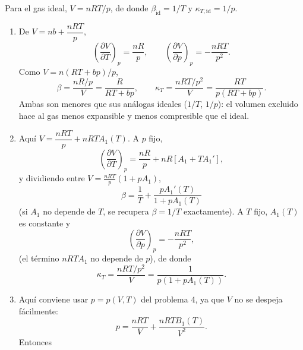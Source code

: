 \documentclass[12pt,a4paper]{article}
\newcommand{\pd}[3]{\left(\frac{\partial #1}{\partial #2}\right)_{#3}}
\begin{document}
    \begin{solucion}
        Para el gas ideal, $V=nRT/p$, de donde $\beta_{\text{id}}=1/T$ y $\kappa_{T,\text{id}}=1/p$.
        \begin{enumerate}
            \item[1)] De $V=nb+\dfrac{nRT}{p}$,
            \begin{equation*}
                \pd VTp=\frac{nR}{p}, \qquad \pd Vpp=-\frac{nRT}{p^{2}}.
            \end{equation*}
            Como $V=n(RT+bp)/p$,
            \begin{equation*}
                \boxed{\beta=\frac{nR/p}{V}=\frac{R}{RT+bp},}\qquad
                \boxed{\kappa_{T}=\frac{nRT/p^{2}}{V}=\frac{RT}{p(RT+bp)}.}
            \end{equation*}
            Ambas son menores que sus análogas ideales ($1/T$, $1/p$): el volumen excluido hace
            al gas menos expansible y menos compresible que el ideal.
            \item[2)] Aquí $V=\dfrac{nRT}{p}+nRTA_{1}(T)$. A $p$ fijo,
            \begin{equation*}
                \pd VTp=\frac{nR}{p}+nR\left[A_{1}+TA_{1}'\right],
            \end{equation*}
            y dividiendo entre $V=\frac{nRT}p(1+pA_1)$,
            \begin{equation*}
                \boxed{\beta=\frac1T+\frac{pA_{1}'(T)}{1+pA_{1}(T)}}
            \end{equation*}
            (si $A_{1}$ no depende de $T$, se recupera $\beta=1/T$ exactamente). A $T$ fijo,
            $A_{1}(T)$ es constante y
            \begin{equation*}
                \pd Vpp=-\frac{nRT}{p^{2}},
            \end{equation*}
            (el término $nRTA_{1}$ no depende de $p$), de donde
            \begin{equation*}
                \boxed{\kappa_{T}=\frac{nRT/p^{2}}{V}=\frac{1}{p\left(1+pA_{1}(T)\right)}.}
            \end{equation*}
            \item[3)] Aquí conviene usar $p=p(V,T)$ del problema 4, ya que $V$ no se despeja
            fácilmente:
            \begin{equation*}
                p=\frac{nRT}{V}+\frac{nRTB_{1}(T)}{V^{2}}.
            \end{equation*}
            Entonces
            \begin{align*}

\end{align*}
\end{enumerate}
\end{solucion}
\end{document}
